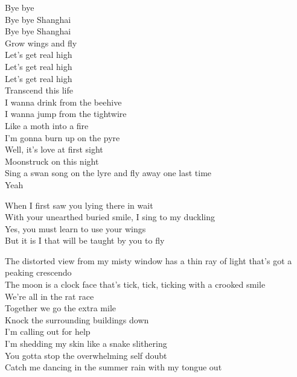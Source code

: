 


Bye bye \\
Bye bye Shanghai\\
Bye bye Shanghai\\
Grow wings and fly\\
Let's get real high\\
Let's get real high\\
Let's get real high\\
Transcend this life\\

I wanna drink from the beehive\\
I wanna jump from the tightwire\\
Like a moth into a fire\\
I'm gonna burn up on the pyre\\
Well, it's love at first sight\\
Moonstruck on this night\\
Sing a swan song on the lyre and fly away one last time\\
Yeah\\


When I first saw you lying there in wait\\
With your unearthed buried smile, I sing to my duckling\\
Yes, you must learn to use your wings\\
But it is I that will be taught by you to fly\\


The distorted view from my misty window has a thin ray of light that's got a peaking crescendo\\
The moon is a clock face that's tick, tick, ticking with a crooked smile\\
We're all in the rat race\\
Together we go the extra mile\\

Knock the surrounding buildings down\\
I'm calling out for help\\
I'm shedding my skin like a snake slithering\\
You gotta stop the overwhelming self doubt\\
Catch me dancing in the summer rain with my tongue out\\
